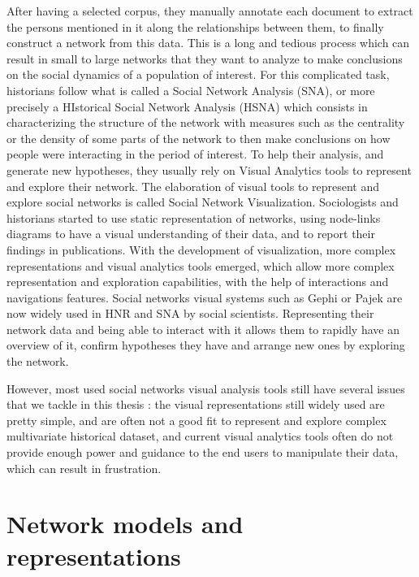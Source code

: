 After having a selected corpus, they manually annotate each document to extract the persons mentioned in it along the relationships between them, to finally construct a network from this data.
This is a long and tedious process which can result in small to large networks that they want to analyze to make conclusions on the social dynamics of a population of interest.
For this complicated task, historians follow what is called a Social Network Analysis (SNA), or more precisely a HIstorical Social Network Analysis (HSNA) which consists in characterizing the structure of the network with measures such as the centrality or the density of some parts of the network to then make conclusions on how people were interacting in the period of interest. To help their analysis, and generate new hypotheses, they usually rely on Visual Analytics tools to represent and explore their network. The elaboration of visual tools to represent and explore social networks is called Social Network Visualization.
Sociologists and historians started to use static representation of networks, using node-links diagrams to have a visual understanding of their data, and to report their findings in publications. With the development of visualization, more complex representations and visual analytics tools emerged, which allow more complex representation and exploration capabilities, with the help of interactions and navigations features. Social networks visual systems such as Gephi or Pajek are now widely used in HNR and SNA by social scientists. Representing their network data and being able to interact with it allows them to rapidly have an overview of it, confirm hypotheses they have and arrange new ones by exploring the network.

However, most used social networks visual analysis tools still have several issues that we tackle in this thesis : the visual representations still widely used are pretty simple, and are often not a good fit to represent and explore complex multivariate historical dataset, and current visual analytics tools often do not provide enough power and guidance to the end users to manipulate their data, which can result in frustration.

\section{Network models and representations}

